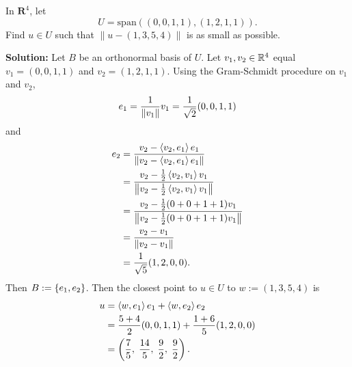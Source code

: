In $\mathbf{R}^4$, let
    \[
        U = \text{span}\left((0,0,1,1) , (1,2,1,1) \right).
    \]
    Find $u \in U$ such that $\|u - (1,3,5,4) \|$ is as small as possible.

    \vspace{0.5in}


    \nl \textbf{Solution: } Let $B$ be an orthonormal basis of $U$. Let $v_1, v_2 \in \mathbb{R}^4$ equal $v_1 = (0,0,1,1)$ and $v_2 = (1,2,1,1).$ Using the Gram-Schmidt procedure on $v_1$ and $v_2$,
    $$e_1 = \frac{1}{\left\| {v_1} \right\|} v_1 = \frac{1}{{\sqrt 2}} (0,0,1,1)$$
    and
    \begin{align*}
    e_2 &= \frac{v_2 - \left\langle{v_2, e_1}\right\rangle e_1}{\left\| {v_2 - \left\langle{v_2, e_1}\right\rangle e_1} \right\|} \\ &= \frac{v_2 - \frac{1}{{2}} \left\langle{v_2,v_1}\right\rangle v_1 }{\left\| {v_2 - \frac{1}{{2}} \left\langle{v_2,v_1}\right\rangle v_1} \right\|}
    \\ &= \frac{v_2 - \frac{1}{{2}}(0 + 0 + 1 + 1) v_1 }{\left\| {v_2 - \frac{1}{{2}}(0 + 0 + 1 + 1) v_1} \right\|}\\
    &= \frac{v_2 - v_1}{\left\| {v_2 - v_1} \right\|}\\
    &= \frac{1}{\sqrt5}(1,2,0,0).
    \end{align*}
Then $B := \left\{{e_1, e_2}\right\}$. Then the closest point to $u \in U$ to $w := (1,3,5,4)$ is 
\begin{align*}
    u &= \left\langle{w, e_1}\right\rangle e_1 + \left\langle{w,e_2}\right\rangle e_2 \\ &= \frac{5+4}{2}(0,0,1,1) + \frac{1 + 6}{5} (1,2,0,0)\\
    &= \left( {\frac75,\; \frac{14}{5},\; \frac92,\; \frac92 } \right).
\end{align*}   